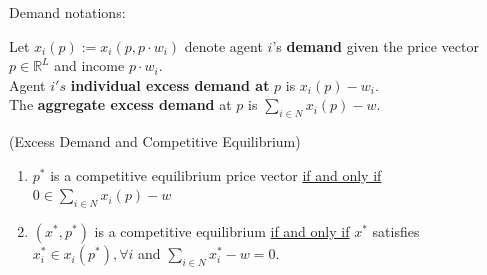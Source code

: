 \documentclass[11pt]{elegantbook}
\begin{document}
Demand notations:
\begin{definition}
    \normalfont
    Let $x_i(p):=x_i(p,p\cdot w_i)$ denote agent $i$'s \textbf{demand} given the price vector $p\in \mathbb{R}^L$ and income $p\cdot w_i$.\\
    Agent $i's$ \textbf{individual excess demand at} $p$ is $x_i(p)-w_i$.\\
    The \textbf{aggregate excess demand} at $p$ is $\sum_{i\in N}x_i(p)-w$.
\end{definition}
\begin{note}(Excess Demand and Competitive Equilibrium)
    \begin{enumerate}[$\circ$]
        \item $p^*$ is a competitive equilibrium price vector \underline{if and only if} $0\in \sum_{i\in N}x_i(p)-w$
        \item $(x^*,p^*)$ is a competitive equilibrium \underline{if and only if} $x^*$ satisfies $x_i^*\in x_i(p^*), \forall i$ and $\sum_{i\in N}x^*_i-w=0$.
    \end{enumerate}
\end{note}
\end{document}

